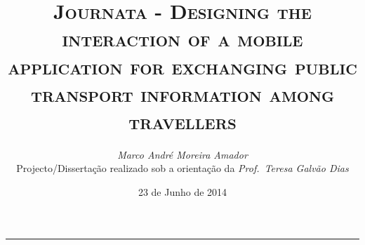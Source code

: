 \documentclass[9pt,a4paper]{extarticle}
\begin{document}
\title{\vspace*{-8mm}\textbf{\textsc{Journata - Designing the interaction of a mobile application for exchanging public transport information among travellers}}}
\author{\emph{Marco André Moreira Amador}\\[2mm]
\small{Projecto/Dissertação realizado sob a orientação da \emph{Prof.\ Teresa Galvão Dias}}\\}
\date{23 de Junho de 2014}
\maketitle
\thispagestyle{empty}

\vspace*{-4mm}\noindent\rule{\textwidth}{0.4pt}\vspace*{4mm}
\end{document}
